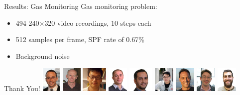 \documentclass[8pt]{beamer}
\begin{document}

\begin{frame}{Results: Gas Monitoring}
	\vspace{2em}
	Gas monitoring problem:
	\begin{itemize}
		\item 494 240$\times$320 video recordings, 10 steps each
		\item 512 samples per frame, SPF rate of 0.67\%
		\item Background noise
	\end{itemize}
	\centering
\end{frame}

\begin{frame}{Thank You!}
\includegraphics[height=35pt]{figures/sasha.png}
\includegraphics[height=35pt]{figures/jim.jpg}
\includegraphics[height=35pt]{figures/peng.jpg}
\includegraphics[height=35pt]{figures/hassan.jpg}
\includegraphics[height=35pt]{figures/saleh.jpeg}
\includegraphics[height=35pt]{figures/yuying.jpeg}
\includegraphics[height=35pt]{figures/nathan.jpg}
\includegraphics[height=35pt]{figures/steve.jpeg}
\includegraphics[height=35pt]{figures/josh.jpg}


\end{frame}
\end{document}
